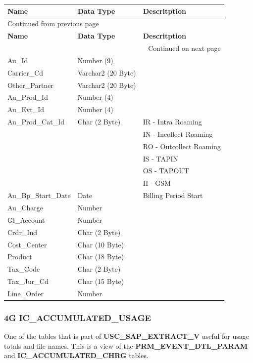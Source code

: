 \documentclass[12pt,twoside]{article}
\begin{document}
\begin{longtable}{l|l|l}
\hline
\textbf{Name} & \textbf{Data Type} & \textbf{Descritption}\\
\hline
\endfirsthead
\multicolumn{3}{l}{Continued from previous page} \\
\hline

\textbf{Name} & \textbf{Data Type} & \textbf{Descritption} \\

\hline
\endhead
\hline\multicolumn{3}{r}{Continued on next page} \\
\endfoot
\endlastfoot
\hline
Au\_Id & Number (9) & \\
Carrier\_Cd & Varchar2 (20 Byte) & \\
Other\_Partner & Varchar2 (20 Byte) & \\
Au\_Prod\_Id & Number (4) & \\
Au\_Evt\_Id & Number (4) & \\
Au\_Prod\_Cat\_Id & Char (2 Byte) & IR - Intra Roaming\\
 &  & IN - Incollect Roaming\\
 &  & RO - Outcollect Roaming\\
 &  & IS - TAPIN\\
 &  & OS - TAPOUT\\
 &  & II - GSM\\
Au\_Bp\_Start\_Date & Date & Billing Period Start\\
Au\_Charge & Number & \\
Gl\_Account & Number & \\
Crdr\_Ind & Char (2 Byte) & \\
Cost\_Center & Char (10 Byte) & \\
Product & Char (18 Byte) & \\
Tax\_Code & Char (2 Byte) & \\
Tax\_Jur\_Cd & Char (15 Byte) & \\
Line\_Order & Number & \\
\hline
\end{longtable}
\normalsize
\subsubsection{4G IC\_ACCUMULATED\_USAGE}
\label{sec:orgheadline132}
One of the tables that is part of \textbf{USC\_SAP\_EXTRACT\_V} useful for usage totals and file names. This is a view of the \textbf{PRM\_EVENT\_DTL\_PARAM} and \textbf{IC\_ACCUMULATED\_CHRG} tables.
\footnotesize
\end{document}
